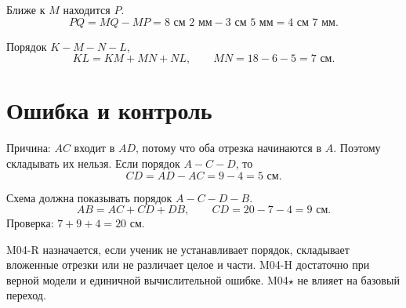 \begin{practicebox}
  Ближе к $M$ находится $P$.
  \[
    PQ=MQ-MP=8\text{ см }2\text{ мм}-3\text{ см }5\text{ мм}
      =4\text{ см }7\text{ мм}.
  \]
\end{practicebox}

\begin{practicebox}[4. Самостоятельно]
  Порядок $K-M-N-L$,
  \[
    KL=KM+MN+NL,\qquad MN=18-6-5=7\text{ см}.
  \]
\end{practicebox}

\section{Ошибка и контроль}

\begin{warningbox}
  Причина: $AC$ входит в $AD$, потому что оба отрезка начинаются в $A$.
  Поэтому складывать их нельзя. Если порядок $A-C-D$, то
  \[
    CD=AD-AC=9-4=5\text{ см}.
  \]
\end{warningbox}

\begin{checkpointbox}[Ответы]
  Схема должна показывать порядок $A-C-D-B$.
  \[
    AB=AC+CD+DB,\qquad CD=20-7-4=9\text{ см}.
  \]
  Проверка: $7+9+4=20$ см.
\end{checkpointbox}

\begin{teacherbox}
  M04-R назначается, если ученик не устанавливает порядок, складывает
  вложенные отрезки или не различает целое и части. M04-H достаточно при
  верной модели и единичной вычислительной ошибке. M04\(\star\) не влияет
  на базовый переход.
\end{teacherbox}
